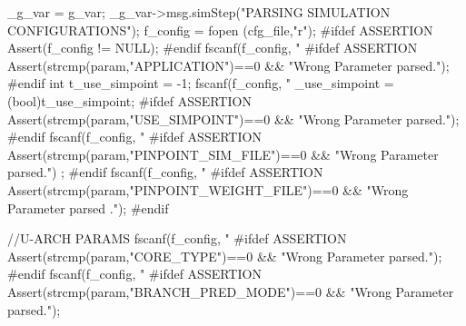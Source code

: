 \begin{DoxyCode}
                                                 {
        _g_var = g_var;
        _g_var->msg.simStep("PARSING SIMULATION CONFIGURATIONS");
        f_config = fopen (cfg_file,"r");
        #ifdef ASSERTION
        Assert(f_config != NULL);
        #endif
        fscanf(f_config, "%
        #ifdef ASSERTION
        Assert(strcmp(param,"APPLICATION")==0 && "Wrong Parameter parsed.");
        #endif
        int t_use_simpoint = -1;
        fscanf(f_config, "%
        _use_simpoint = (bool)t_use_simpoint;
        #ifdef ASSERTION
        Assert(strcmp(param,"USE_SIMPOINT")==0 && "Wrong Parameter parsed.");
        #endif
        fscanf(f_config, "%
        #ifdef ASSERTION
        Assert(strcmp(param,"PINPOINT_SIM_FILE")==0 && "Wrong Parameter parsed.")
      ;
        #endif
        fscanf(f_config, "%
        #ifdef ASSERTION
        Assert(strcmp(param,"PINPOINT_WEIGHT_FILE")==0 && "Wrong Parameter parsed
      .");
        #endif

        //U-ARCH PARAMS
        fscanf(f_config, "%
        #ifdef ASSERTION
        Assert(strcmp(param,"CORE_TYPE")==0 && "Wrong Parameter parsed.");
        #endif
        fscanf(f_config, "%
        #ifdef ASSERTION
        Assert(strcmp(param,"BRANCH_PRED_MODE")==0 && "Wrong Parameter parsed.");
      
}
\end{DoxyCode}
